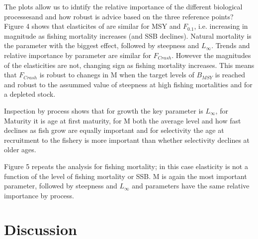 \documentclass{pnastwo}
\begin{document}
\begin{article}
The plots allow us to idntify the relative importance of the different biological processesand and how robust is advice based on the three reference points?
Figure 4 shows that elasticites of are similar for MSY and $F_{0.1}$, i.e. increasing in magnitude as fishing mortality increases (and SSB declines). Natural mortality
is the parameter with the biggest effect, followed by steepness and $L_{\infty}$. Trends and relative importance by parameter are similar for $F_{Crash}$.
However the magnitudes of the elasticities are not, changing sign as fishing mortality increases. This means that $F_{Crash}$ is robust to chanegs in M when 
the target levels of $B_{MSY}$ is reached and robust to the assummed value of steepness at high fishing mortalities and for a depleted stock.

Inspection by process shows that for growth the key parameter is $L_{\infty}$, for Maturity it is age at first maturity, for M both the average level and 
how fast declines as fish grow are equally important and for selectivity the age at recruitment to the fishery is more important than whether
selectivity declines at older ages.

Figure 5 repeats the analysis for fishing mortality; in this case elasticity is not a function of the level of
fishing mortality or SSB. M is again the most important parameter, followed by steepness and $L_{\infty}$ and parameters have the same relative importance
by process.  
  

\section{Discussion}



\end{article}
\end{document}
